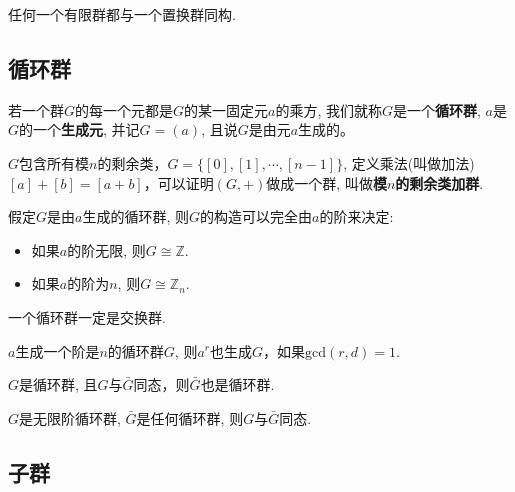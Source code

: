 \begin{Theorem}
任何一个有限群都与一个置换群同构.
\end{Theorem}

\subsection{循环群}

\begin{Definition}[循环群]
若一个群$G$的每一个元都是$G$的某一固定元$a$的乘方, 我们就称$G$是一个\textbf{循环群}, $a$是$G$的一个\textbf{生成元}, 并记$G = (a)$, 且说$G$是由元$a$生成的。
\end{Definition}

\begin{Definition}
$G$包含所有模$n$的剩余类，$G = \{ [0], [1], \cdots, [n-1] \}$, 定义乘法(叫做加法) $[a] + [b] = [a +b]$，可以证明$(G, +)$做成一个群, 叫做\textbf{模$n$的剩余类加群}.
\end{Definition}

\begin{Theorem}
假定$G$是由$a$生成的循环群, 则$G$的构造可以完全由$a$的阶来决定:
\begin{itemize}
\item 如果$a$的阶无限, 则$G \cong \mathbb{Z}$.
\item 如果$a$的阶为$n$, 则$G \cong \mathbb{Z}_n$. 
\end{itemize}
\end{Theorem}

\begin{Proposition}
一个循环群一定是交换群.
\end{Proposition}

\begin{Proposition}
$a$生成一个阶是$n$的循环群$G$, 则$a^r$也生成$G$，如果$\text{gcd}(r, d) = 1$.
\end{Proposition}

\begin{Proposition}
$G$是循环群, 且$G$与$\bar{G}$同态，则$\bar{G}$也是循环群.
\end{Proposition}

\begin{Proposition}
$G$是无限阶循环群, $\bar{G}$是任何循环群, 则$G$与$\bar{G}$同态.
\end{Proposition}

\subsection{子群}

